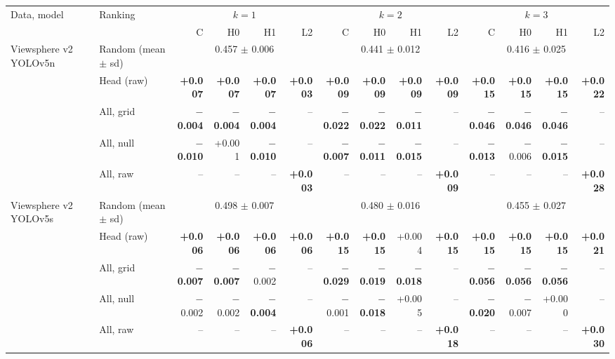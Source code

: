 \begin{tabular}{llrrrrrrrrrrrr}
\toprule
Data, model & Ranking & \multicolumn{4}{c}{$k=1$} & \multicolumn{4}{c}{$k=2$} & \multicolumn{4}{c}{$k=3$} \\
\cmidrule(lr){3-6}\cmidrule(lr){7-10}\cmidrule(lr){11-14}
 & & C & H0 & H1 & L2 & C & H0 & H1 & L2 & C & H0 & H1 & L2 \\
\midrule
Viewsphere v2 YOLOv5n & Random (mean $\pm$ sd) & \multicolumn{4}{c}{0.457 $\pm$ 0.006} & \multicolumn{4}{c}{0.441 $\pm$ 0.012} & \multicolumn{4}{c}{0.416 $\pm$ 0.025} \\
 & Head (raw) & \textbf{+0.007} & \textbf{+0.007} & \textbf{+0.007} & \textbf{+0.003} & \textbf{+0.009} & \textbf{+0.009} & \textbf{+0.009} & \textbf{+0.009} & \textbf{+0.015} & \textbf{+0.015} & \textbf{+0.015} & \textbf{+0.022} \\
 & All, grid & \textbf{$-$0.004} & \textbf{$-$0.004} & \textbf{$-$0.004} & -- & \textbf{$-$0.022} & \textbf{$-$0.022} & \textbf{$-$0.011} & -- & \textbf{$-$0.046} & \textbf{$-$0.046} & \textbf{$-$0.046} & -- \\
 & All, null & \textbf{$-$0.010} & +0.001 & \textbf{$-$0.010} & -- & \textbf{$-$0.007} & \textbf{$-$0.011} & \textbf{$-$0.015} & -- & \textbf{$-$0.013} & $-$0.006 & \textbf{$-$0.015} & -- \\
 & All, raw & -- & -- & -- & \textbf{+0.003} & -- & -- & -- & \textbf{+0.009} & -- & -- & -- & \textbf{+0.028} \\
\midrule
Viewsphere v2 YOLOv5s & Random (mean $\pm$ sd) & \multicolumn{4}{c}{0.498 $\pm$ 0.007} & \multicolumn{4}{c}{0.480 $\pm$ 0.016} & \multicolumn{4}{c}{0.455 $\pm$ 0.027} \\
 & Head (raw) & \textbf{+0.006} & \textbf{+0.006} & \textbf{+0.006} & \textbf{+0.006} & \textbf{+0.015} & \textbf{+0.015} & +0.004 & \textbf{+0.015} & \textbf{+0.015} & \textbf{+0.015} & \textbf{+0.015} & \textbf{+0.021} \\
 & All, grid & \textbf{$-$0.007} & \textbf{$-$0.007} & $-$0.002 & -- & \textbf{$-$0.029} & \textbf{$-$0.019} & \textbf{$-$0.018} & -- & \textbf{$-$0.056} & \textbf{$-$0.056} & \textbf{$-$0.056} & -- \\
 & All, null & $-$0.002 & $-$0.002 & \textbf{$-$0.004} & -- & $-$0.001 & \textbf{$-$0.018} & +0.005 & -- & \textbf{$-$0.020} & $-$0.007 & +0.000 & -- \\
 & All, raw & -- & -- & -- & \textbf{+0.006} & -- & -- & -- & \textbf{+0.018} & -- & -- & -- & \textbf{+0.030} \\
\bottomrule
\end{tabular}
